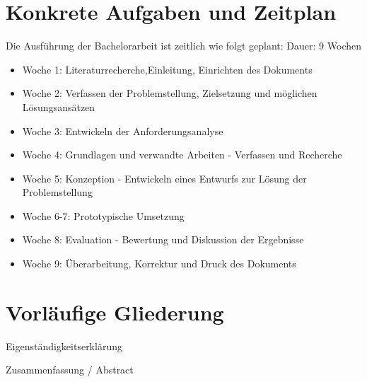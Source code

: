 \documentclass[11pt]{scrartcl}
\begin{document}
\pagebreak

\section{Konkrete Aufgaben und Zeitplan}

Die Ausführung der Bachelorarbeit ist zeitlich wie folgt geplant:
\newline
Dauer: 9 Wochen

\begin{itemize}
	\item Woche 1: Literaturrecherche,Einleitung, Einrichten des Dokuments
 	\item Woche 2: Verfassen der Problemstellung, Zielsetzung und möglichen Lösungsansätzen
 	\item Woche 3: Entwickeln der Anforderungsanalyse
 	\item Woche 4: Grundlagen und verwandte Arbeiten - Verfassen und Recherche
 	\item Woche 5: Konzeption - Entwickeln eines Entwurfs zur Lösung der Problemstellung
 	\item Woche 6-7: Prototypische Umsetzung
 	\item Woche 8: Evaluation - Bewertung und Diskussion der Ergebnisse
 	\item Woche 9: Überarbeitung, Korrektur und Druck des Dokuments
\end{itemize}


\section{\label{sec:gliederung}Vorläufige Gliederung}

{\parindent=5mm 
Eigenständigkeitserklärung

Zusammenfassung / Abstract}
\end{document}
